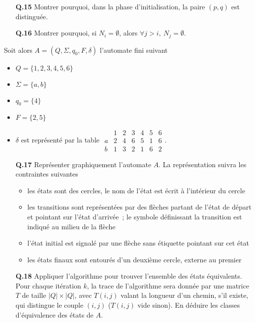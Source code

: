 \documentclass[11pt,a4paper]{article}\nofiles
\begin{document}
\begin{enumerate}
\item[{\bf Q.15}] Montrer pourquoi, dans la phase d'initialisation, la paire $(p,q)$ est distingu\'ee.
\item[{\bf Q.16}] Montrer pourquoi, si $N_i=\emptyset$, alors $\forall j>i,\ N_j=\emptyset$.
\end{enumerate}
Soit alors $A=(Q,\Sigma,q_0,F,\delta)$ l'automate fini suivant
\begin{itemize}
\item $Q=\{1,2,3,4,5,6\}$
\item $\Sigma=\{a,b\}$
\item $q_0=\{4\}$
\item $F=\{2,5\}$
\item $\delta$ est repr\'esent\'e par la table $\begin{array}{c|c|c|c|c|c|c}&1&2&3&4&5&6\\\hline
a&2&4&6&5&1&6\\\hline
b&1&3&2&1&6&2\end{array}$.
\end{itemize}
\begin{enumerate} 
\item[{\bf Q.17}] Repr\'esenter graphiquement l'automate $A$. La repr\'esentation suivra les contraintes suivantes
\begin{itemize}
\item les \'etats sont des cercles, le nom de l'\'etat est \'ecrit \`a l'int\'erieur du cercle
\item les transitions sont repr\'esent\'ees par des fl\`eches partant de l'\'etat de d\'epart et pointant sur l'\'etat d'arriv\'ee~; le symbole d\'efinissant la transition est indiqu\'e au milieu de la fl\`eche
\item l'\'etat initial est signal\'e par une fl\`eche sans \'etiquette pointant sur cet \'etat
\item les \'etats finaux sont entour\'es d'un deuxi\`eme cercle, externe au premier
\end{itemize}
\item[{\bf Q.18}] Appliquer l'algorithme pour trouver l'ensemble des \'etats \'equivalents. 
Pour chaque it\'eration $k$, la trace de l'algorithme sera donn\'ee par une matrice $T$ de taille $|Q|\times |Q|$, avec $T(i,j)$ valant la longueur d'un chemin, s'il existe, qui distingue le couple $(i,j)$ ($T(i,j)$ vide sinon). 
En d\'eduire les classes d'\'equivalence des \'etats de $A$.
\end{enumerate}
\end{document}
